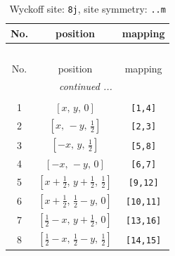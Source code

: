 \documentclass[fleqn,8pt]{jsarticle}
\begin{document}
\begin{longtable}{ccc}
\caption{Wyckoff site: {\tt 8j}, site symmetry: {\tt ..m}}
 \\
 \hline \hline
No. & position & mapping \\ \hline \endfirsthead

\multicolumn{2}{l}{\tablename\ \thetable{}} \\
 \hline \hline
No. & position & mapping \\ \hline \endhead

 \hline \hline
\multicolumn{2}{r}{\footnotesize\it continued ...} \\ \endfoot

 \hline \hline
\multicolumn{2}{r}{} \\ \endlastfoot

1 & $\left[ x,\, y,\, 0 \right]$ & {\tt [1,4]} \\ \hline
2 & $\left[ x,\, - y,\, \frac{1}{2} \right]$ & {\tt [2,3]} \\ \hline
3 & $\left[ - x,\, y,\, \frac{1}{2} \right]$ & {\tt [5,8]} \\ \hline
4 & $\left[ - x,\, - y,\, 0 \right]$ & {\tt [6,7]} \\ \hline
5 & $\left[ x + \frac{1}{2},\, y + \frac{1}{2},\, \frac{1}{2} \right]$ & {\tt [9,12]} \\ \hline
6 & $\left[ x + \frac{1}{2},\, \frac{1}{2} - y,\, 0 \right]$ & {\tt [10,11]} \\ \hline
7 & $\left[ \frac{1}{2} - x,\, y + \frac{1}{2},\, 0 \right]$ & {\tt [13,16]} \\ \hline
8 & $\left[ \frac{1}{2} - x,\, \frac{1}{2} - y,\, \frac{1}{2} \right]$ & {\tt [14,15]} \\
\end{longtable}
\renewcommand{\arraystretch}{1.2}
\end{document}
